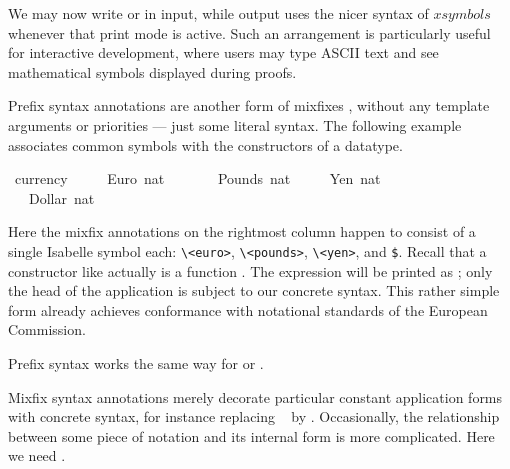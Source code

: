 \begin{isabellebody}
\begin{isamarkuptext}
  \medskip We may now write  or  in
  input, while output uses the nicer syntax of $xsymbols$ whenever
  that print mode is active.  Such an arrangement is particularly
  useful for interactive development, where users may type ASCII text
  and see mathematical symbols displayed during proofs.%
\end{isamarkuptext}%
\isamarkuptrue%
%
\isamarkuptrue%
%
\begin{isamarkuptext}%
Prefix syntax annotations are another form
  of mixfixes \cite{isabelle-ref}, without any template arguments or
  priorities --- just some literal syntax.  The following example
  associates common symbols with the constructors of a datatype.%
\end{isamarkuptext}%
\isamarkuptrue%
\isamarkupfalse%
\ currency\ {\isacharequal}\isanewline
\ \ \ \ Euro\ nat\ \ \ \ {\isacharparenleft}{\isachardoublequoteopen}{\isasymeuro}{\isachardoublequoteclose}{\isacharparenright}\isanewline
\ \ {\isacharbar}\ Pounds\ nat\ \ {\isacharparenleft}{\isachardoublequoteopen}{\isasympounds}{\isachardoublequoteclose}{\isacharparenright}\isanewline
\ \ {\isacharbar}\ Yen\ nat\ \ \ \ \ {\isacharparenleft}{\isachardoublequoteopen}{\isasymyen}{\isachardoublequoteclose}{\isacharparenright}\isanewline
\ \ {\isacharbar}\ Dollar\ nat\ \ {\isacharparenleft}{\isachardoublequoteopen}{\isachardollar}{\isachardoublequoteclose}{\isacharparenright}%
\begin{isamarkuptext}%
\noindent Here the mixfix annotations on the rightmost column happen
  to consist of a single Isabelle symbol each: \verb,\,\verb,<euro>,,
  \verb,\,\verb,<pounds>,, \verb,\,\verb,<yen>,, and \verb,$,.  Recall
  that a constructor like  actually is a function .  The expression  will be
  printed as ; only the head of the application is
  subject to our concrete syntax.  This rather simple form already
  achieves conformance with notational standards of the European
  Commission.

  Prefix syntax works the same way for  or
  .%
\end{isamarkuptext}%
\isamarkuptrue%
%
\isamarkuptrue%
%
\begin{isamarkuptext}%
Mixfix syntax annotations merely decorate particular constant
  application forms with concrete syntax, for instance replacing \
   by .  Occasionally, the
  relationship between some piece of notation and its internal form is
  more complicated.  Here we need \bfindex{syntax translations}.


\end{isamarkuptext}
\end{isabellebody}
